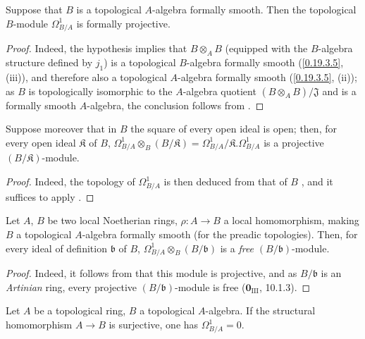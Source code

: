 \begin{theorem}[20.4.9]
\label{0.20.4.9}
Suppose that $B$ is a topological $A$-algebra formally smooth.
Then the topological $B$-module $\Omega^1_{B/A}$ is formally projective.
\end{theorem}

\begin{proof}
Indeed, the hypothesis implies that $B\otimes_A B$ (equipped with the $B$-algebra structure defined by $j_1$) is a topological $B$-algebra formally smooth (\ref{0.19.3.5}, (iii)), and therefore also a topological $A$-algebra formally smooth (\ref{0.19.3.5}, (ii)); as $B$ is topologically isomorphic to the $A$-algebra quotient $(B\otimes_A B)/\mathfrak{J}$ and is a formally smooth $A$-algebra, the conclusion follows from .
\end{proof}

\begin{corollary}[20.4.10]
\label{0.20.4.10}
Suppose moreover that in $B$ the square of every open ideal is open; then, for every open ideal $\mathfrak{K}$ of $B$, $\Omega^1_{B/A}\otimes_B(B/\mathfrak{K})=\Omega^1_{B/A}/\mathfrak{K}.\Omega^1_{B/A}$ is a projective $(B/\mathfrak{K})$-module.
\end{corollary}

\begin{proof}
Indeed, the topology of $\Omega^1_{B/A}$ is then deduced from that of $B$ , and it suffices to apply .
\end{proof}

\begin{corollary}[20.4.11]
\label{0.20.4.11}
Let $A$, $B$ be two local Noetherian rings, $\rho:A\to B$ a local homomorphism, making $B$ a topological $A$-algebra formally smooth \textup{(}for the preadic topologies\textup{)}.
Then, for every ideal of definition $\mathfrak{b}$ of $B$, $\Omega^1_{B/A}\otimes_B(B/\mathfrak{b})$ is a \emph{free} $(B/\mathfrak{b})$-module.
\end{corollary}

\begin{proof}
Indeed, it follows from  that this module is projective, and as $B/\mathfrak{b}$ is an \emph{Artinian} ring, every projective $(B/\mathfrak{b})$-module is free ($\mathbf{0}_{\mathrm{III}}$, 10.1.3).
\end{proof}

\begin{proposition}[20.4.12]
\label{0.20.4.12}
Let $A$ be a topological ring, $B$ a topological $A$-algebra.
If the structural homomorphism $A\to B$ is surjective, one has $\Omega^1_{B/A}=0$.
\end{proposition}

